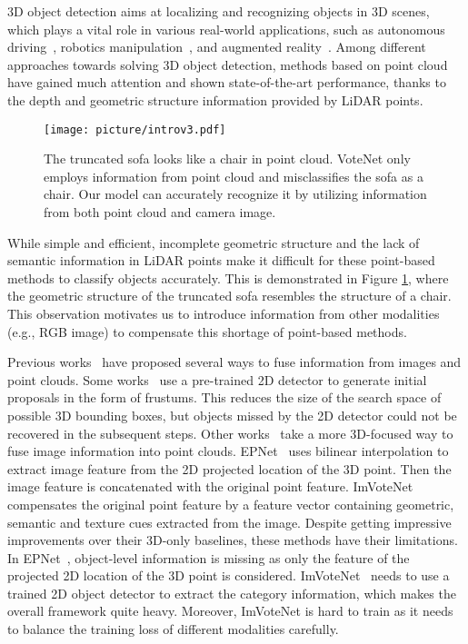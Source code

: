 \documentclass[runningheads]{llncs}
\begin{document}
3D object detection aims at localizing and recognizing objects in 3D scenes, which plays a vital role in various real-world applications, such as autonomous driving~\cite{wang2019monocular}, robotics manipulation~\cite{wang2019densefusion}, and augmented reality~\cite{azuma1997survey}. Among different approaches towards solving 3D object detection, methods based on point
cloud~\cite{qi2019deep,rukhovich2021fcaf3d,liu2021group,misra2021end,zhang2020h3dnet,xie2020mlcvnet,cheng2021back} have gained much attention and shown state-of-the-art performance, thanks to the depth and geometric structure information provided by LiDAR points.

\begin{figure}
\centering
\texttt{[image: picture/introv3.pdf]}
\caption{The truncated sofa looks like a chair in point cloud. VoteNet \cite{qi2019deep} only employs information from point cloud and misclassifies the sofa as a chair. Our model can accurately recognize it by utilizing information from both point cloud and camera image.}
\label{fig:intro}
\end{figure}

While simple and efficient, incomplete geometric structure and the lack of semantic information in LiDAR points make it difficult for these point-based methods to classify objects accurately. This is demonstrated in Figure \ref{fig:intro}, where the geometric structure of the truncated sofa resembles the structure of a chair. This observation motivates us to introduce information from other modalities (e.g., RGB image) to compensate this shortage of point-based methods.

Previous works~\cite{qi2018frustum,qi2020imvotenet,10.1007/978-3-030-58555-6_3,liu2022epnet,xu2018pointfusion,Lahoud_2017_ICCV} have proposed several ways to fuse information from images and point clouds. Some works~\cite{Lahoud_2017_ICCV,xu2018pointfusion,qi2018frustum} use a pre-trained 2D detector to generate initial proposals in the form of frustums. This reduces the size of the search space of possible 3D bounding boxes, but objects missed by the 2D detector could not be recovered in the subsequent steps. Other works~\cite{qi2020imvotenet,10.1007/978-3-030-58555-6_3,liu2022epnet} take a more 3D-focused way to fuse image information into point clouds. EPNet~\cite{liu2022epnet} uses bilinear interpolation to extract image feature from the 2D projected location of the 3D point. Then the image feature is concatenated with the original point feature. ImVoteNet~\cite{qi2020imvotenet} compensates the original point feature by a feature vector containing geometric, semantic and texture cues extracted from the image. Despite getting impressive improvements over their 3D-only baselines, these methods have their limitations. In EPNet~\cite{liu2022epnet}, object-level information is missing as only the feature of the projected 2D location of the 3D point is considered. ImVoteNet~\cite{qi2020imvotenet} needs to use a trained 2D object detector to extract the category information, which makes the overall framework quite heavy. Moreover, ImVoteNet is hard to train as it needs to balance the training loss of different modalities carefully.
\end{document}
